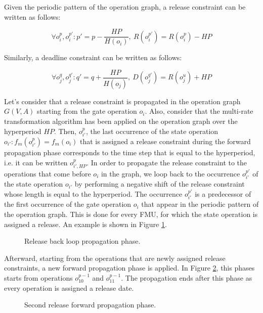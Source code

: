 Given the periodic pattern of the operation graph, a release constraint can be written as follows:

\begin{equation}
\forall o_i^p, o_i^{p'}: p' = p - \frac{HP}{H(o_i)},\ R(o_i^{p'}) = R(o_i^p) - HP
\label{eq:release}
\end{equation}

Similarly, a deadline constraint can be written as follows:

\begin{equation}
\forall o_j^q, o_j^{q'}: q' = q + \frac{HP}{H(o_j)},\ D(o_j^{q'}) = R(o_j^u) + HP
\label{eq:release}
\end{equation}

Let's consider that a release constraint is propagated in the operation graph $G(V,A)$ starting from the gate operation $o_i$.  Also, consider that the multi-rate transformation algorithm has been applied on the operation graph over the hyperperiod $HP$. Then, $o_{i'}^p$, the last occurrence of the state operation $o_{i'}: f_m(o_{i'}^p) = f_m(o_i)$ that is assigned a release constraint during the forward propagation phase corresponds to the time step that is equal to the hyperperiod, i.e. it can be written $o_{i',HP}^p$. In order to propagate the release constraint to the operations that come before $o_i$ in the graph, we loop back to the occurrence $o_{i'}^{p'}$ of the state operation $o_{i'}$ by performing a negative shift of the release constraint whose length is equal to the hyperperiod. The occurrence $o_{i'}^{p'}$ is a predecessor of the first occurrence of the gate operation $o_i$ that appear in the periodic pattern of the operation graph. This is done for every FMU, for which the state operation is assigned a release. An example is shown in Figure \ref{fig:rloop}.

\begin{figure}[phbt]
\centering

\caption{Release back loop propagation phase.}
\label{fig:rloop}
\end{figure}

Afterward, starting from the operations that are newly assigned release constraints, a new forward propagation phase is applied. In Figure \ref{fig:rpropagation2}, this phases starts from operations $o_{10}^{p-1}$ and $o_{11}^{p-1}$. The propagation ends after this phase as every operation is assigned a release date. 


\begin{figure}[phbt]
\centering

\caption{Second release forward propagation phase.}
\label{fig:rpropagation2}
\end{figure}

